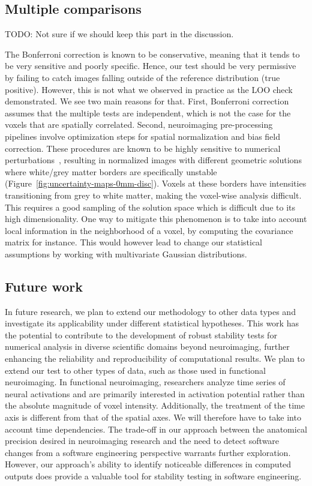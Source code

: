 \documentclass[lettersize,journal]{IEEEtran}
\newcommand{\TODO}[1]{\color{red}\textsc{TODO:} #1\color{black}\xspace}
\begin{document}
\subsection*{Multiple comparisons}

\TODO{Not sure if we should keep this part in the discussion.}

The Bonferroni correction is known to be conservative, meaning that it tends to be very sensitive and poorly specific.
Hence, our test should be very permissive by failing to catch images falling outside of the reference distribution (true positive).
However, this is not what we observed in practice as the LOO check demonstrated. We see two main reasons for that.
First, Bonferroni correction assumes that the multiple tests are independent, which is not the case for the voxels that are spatially correlated.
Second, neuroimaging pre-processing pipelines involve optimization steps for spatial normalization and bias field correction.
These procedures are known to be highly sensitive to numerical perturbations~\cite{clarenz2006computational}, resulting in normalized images with
different geometric solutions where white/grey matter borders are specifically unstable (Figure~\ref{fig:uncertainty-maps-0mm-disc}).
Voxels at these borders have intensities transitioning from grey to white matter, making the voxel-wise analysis difficult. This requires a good sampling of the solution space which is difficult due to its high dimensionality. One way to mitigate this phenomenon is to take into account local information in the neighborhood of a voxel, by computing the covariance matrix for instance. This would however lead to change our statistical assumptions by working with multivariate Gaussian distributions.


\subsection*{Future work}

In future research, we plan to extend our methodology to other data types and investigate its applicability under different statistical hypotheses.
This work has the potential to contribute to the development of robust stability tests for numerical analysis in diverse scientific domains beyond neuroimaging, further enhancing the reliability and reproducibility of computational results.
We plan to extend our test to other types of data, such as those used in functional neuroimaging.
In functional neuroimaging, researchers analyze time series of neural activations and are primarily interested in activation potential rather than the absolute magnitude of voxel intensity.
Additionally, the treatment of the time axis is different from that of the spatial axes. We will therefore have to take into account time dependencies.
The trade-off in our approach between the anatomical precision desired in neuroimaging research and the need to detect software changes from a software engineering perspective warrants further exploration. However, our approach's ability to identify noticeable differences in computed outputs does provide a valuable tool for stability testing in software engineering.
\end{document}
